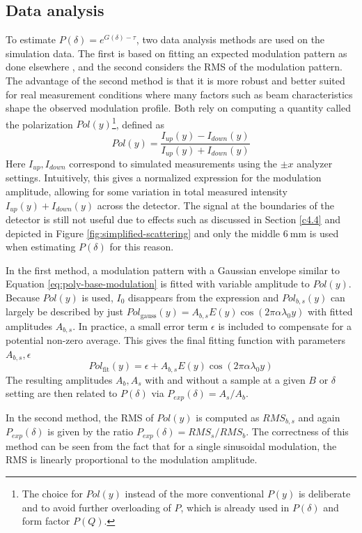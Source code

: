 \subsection{Data analysis}
To estimate $P(\delta) = e^{G(\delta)  - \tau}$, two data analysis methods are used on the simulation data. The first is based on fitting an expected modulation pattern as done elsewhere \cite{bouwman2011}\cite{parnell2023}, and the second considers the RMS of the modulation pattern. The advantage of the second method is that it is more robust and better suited for real measurement conditions where many factors such as beam characteristics shape the observed modulation profile. Both rely on computing a quantity called the polarization $Pol(y)$\footnote{The choice for $Pol(y)$ instead of the more conventional $P(y)$ is deliberate and to avoid further overloading of $P$, which is already used in $P(\delta)$ and form factor $P(Q)$.}, defined as 
$$Pol(y) = \frac{I_{up}(y) - I_{down}(y)}{I_{up}(y) + I_{down}(y)}$$
Here $I_{up}, I_{down}$ correspond to simulated measurements using the $\pm x$ analyzer settings. Intuitively, this gives a normalized expression for the modulation amplitude, allowing for some variation in total measured intensity $I_{up}(y) + I_{down}(y)$ across the detector. The signal at the boundaries of the detector is still not useful due to effects such as discussed in Section \ref{c4.4} and depicted in Figure \ref{fig:simplified-scattering} and only the middle $\SI{6}{\milli\meter}$ is used when estimating $P(\delta)$ for this reason.

In the first method, a modulation pattern with a Gaussian envelope similar to Equation \eqref{eq:poly-base-modulation} is fitted with variable amplitude to $Pol(y)$. Because $Pol(y)$ is used, $I_0$ disappears from the expression and $Pol_{b,s}(y)$ can largely be described by just $Pol_{\text{gauss}}(y) = A_{b,s}E(y)\cos(2\pi\alpha\lambda_0y)$ with fitted amplitudes $A_{b,s}$. In practice, a small error term $\epsilon$ is included to compensate for a potential non-zero average. This gives the final fitting function with parameters $A_{b,s}, \epsilon$
\begin{equation}
	Pol_{\text{fit}}(y) = \epsilon+ A_{b,s}E(y)\cos(2\pi\alpha\lambda_0y) \label{eq:gauss-fit-function}
\end{equation}
The resulting amplitudes $A_b, A_s$ with and without a sample at a given $B$ or $\delta$ setting are then related to $P(\delta)$ via $P_{exp}(\delta) = A_s/A_b$. 

In the second method, the RMS of $Pol(y)$ is computed as $RMS_{b,s}$ and again $P_{exp}(\delta)$ is given by the ratio $P_{exp}(\delta) = RMS_s/RMS_b$. The correctness of this method can be seen from the fact that for a single sinusoidal modulation, the RMS is linearly proportional to the modulation amplitude. 

